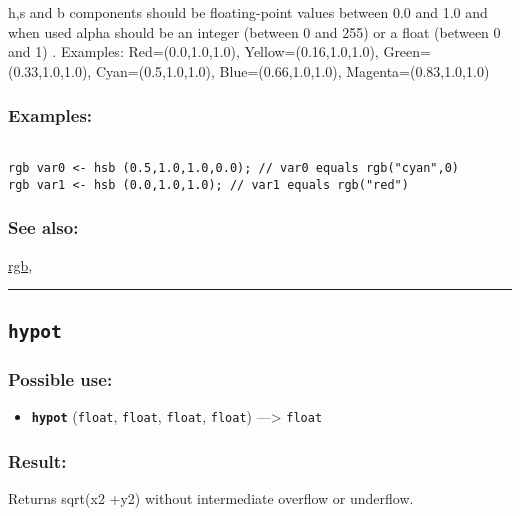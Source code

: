 \documentclass[]{book}
\providecommand{\tightlist}{%
  \setlength{\itemsep}{0pt}\setlength{\parskip}{0pt}}
\theoremstyle{definition}
\theoremstyle{definition}
\theoremstyle{definition}
\theoremstyle{remark}
\begin{document}
h,s and b components should be floating-point values between 0.0 and 1.0
and when used alpha should be an integer (between 0 and 255) or a float
(between 0 and 1) . Examples: Red=(0.0,1.0,1.0), Yellow=(0.16,1.0,1.0),
Green=(0.33,1.0,1.0), Cyan=(0.5,1.0,1.0), Blue=(0.66,1.0,1.0),
Magenta=(0.83,1.0,1.0)

\subsubsection{Examples:}\label{examples-200}

\begin{verbatim}
 
rgb var0 <- hsb (0.5,1.0,1.0,0.0); // var0 equals rgb("cyan",0) 
rgb var1 <- hsb (0.0,1.0,1.0); // var1 equals rgb("red")
\end{verbatim}

\subsubsection{See also:}\label{see-also-113}

\href{OperatorsNR\#rgb}{rgb},

\begin{center}\rule{0.5\linewidth}{\linethickness}\end{center}

\subsection{\texorpdfstring{\texttt{hypot}}{hypot}}\label{hypot}

\subsubsection{Possible use:}\label{possible-use-262}

\begin{itemize}
\tightlist
\item
  \textbf{\texttt{hypot}} (\texttt{float}, \texttt{float},
  \texttt{float}, \texttt{float}) ---\textgreater{} \texttt{float}
\end{itemize}

\subsubsection{Result:}\label{result-252}

Returns sqrt(x2 +y2) without intermediate overflow or underflow.
\end{document}
